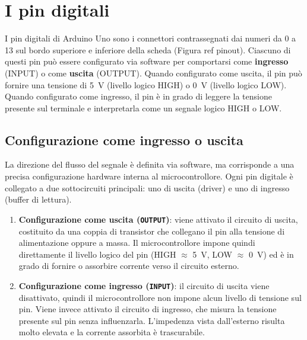 \section{I pin digitali}

I pin digitali di Arduino Uno sono i connettori contrassegnati dai numeri da 0 a 13 sul bordo superiore e inferiore della scheda (Figura ref pinout). Ciascuno di questi pin può essere configurato via software per comportarsi come \textbf{ingresso} (INPUT) o come \textbf{uscita} (OUTPUT). Quando configurato come uscita, il pin può fornire una tensione di \SI{5}{\volt} (livello logico HIGH) o \SI{0}{\volt} (livello logico LOW). Quando configurato come ingresso, il pin è in grado di leggere la tensione presente sul terminale e interpretarla come un segnale logico HIGH o LOW.

\subsection*{Configurazione come ingresso o uscita}

La direzione del flusso del segnale è definita via software, ma corrisponde a una precisa configurazione hardware interna al microcontrollore. Ogni pin digitale è collegato a due sottocircuiti principali: uno di uscita (driver) e uno di ingresso (buffer di lettura).

\begin{enumerate}
    \item \textbf{Configurazione come uscita (\texttt{OUTPUT})}: viene attivato il circuito di uscita, costituito da una coppia di transistor che collegano il pin alla tensione di alimentazione oppure a massa. Il microcontrollore impone quindi direttamente il livello logico del pin (HIGH $\approx$ \SI{5}{\volt}, LOW $\approx$ \SI{0}{\volt}) ed è in grado di fornire o assorbire corrente verso il circuito esterno.

    \item \textbf{Configurazione come ingresso (\texttt{INPUT})}: il circuito di uscita viene disattivato, quindi il microcontrollore non impone alcun livello di tensione sul pin. Viene invece attivato il circuito di ingresso, che misura la tensione presente sul pin senza influenzarla. L'impedenza vista dall'esterno risulta molto elevata e la corrente assorbita è trascurabile.
\end{enumerate}

